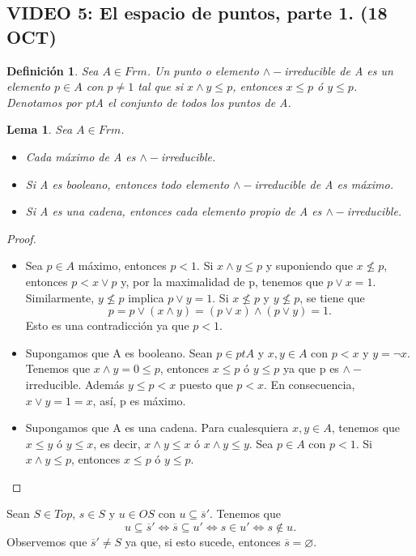 \documentclass[12pt,letterpaper,titlepage]{article}
\let\emptyset\varnothing
\newtheorem*{defn}{Definición}
\newtheorem*{lemma}{Lema}
\theoremstyle{definition}
\renewcommand\sup{\vee}
\renewcommand\inf{\wedge}
\newcommand\<{\langle}
\renewcommand\>{\rangle}
\begin{document}
\subsection{VIDEO 5: El espacio de puntos, parte 1. (18 OCT)}
\begin{defn}
  Sea $A\in Frm$. Un punto o elemento $\inf-$irreducible de A es un elemento $p\in A$ con $p\neq 1$ tal que si $x\inf y\leq p$, entonces $x\leq p$ ó $y\leq p$. Denotamos por ptA el conjunto de todos los puntos de A.
\end{defn}
\begin{lemma}
  Sea $A\in Frm$.
  \begin{itemize}
      \item Cada máximo de A es $\inf-$irreducible.
      \item Si A es booleano, entonces todo elemento $\inf-$irreducible de A es máximo.
      \item Si A es una cadena, entonces cada elemento propio de A es $\inf-$irreducible.
  \end{itemize}
\end{lemma}
\begin{proof}\quad
  \begin{itemize}
      \item Sea $p\in A$ máximo, entonces $p<1$. Si $x\inf y\leq p$ y suponiendo que $x\not\leq p$, entonces $p<x\sup p$ y, por la maximalidad de p, tenemos que $p\sup x=1$. Similarmente, $y\not\leq p$ implica $p\sup y=1$. Si $x\not\leq p$ y $y\not\leq p$, se tiene que 
      \[p=p\sup (x\inf y)=(p\sup x)\inf(p\sup y)=1.\]
      Esto es una contradicción ya que $p<1$.
      \item Supongamos que A es booleano. Sean $p\in ptA$ y $x,y\in A$ con $p<x$ y $y=\neg x$. Tenemos que $x\inf y=0\leq p$, entonces $x\leq p$ ó $y\leq p$ ya que p es $\inf-$irreducible. Además $y\leq p<x$ puesto que $p<x$. En consecuencia, $x\sup y=1=x$, así, p es máximo.
      \item Supongamos que A es una cadena. Para cualesquiera $x,y\in A$, tenemos que $x\leq y$ ó $y\leq x$, es decir, $x\inf y\leq x$ ó $x\inf y\leq y$. Sea $p\in A$ con $p<1$. Si $x\inf y\leq p$, entonces $x\leq p$ ó $y\leq p$.
  \end{itemize}
\end{proof}
Sean $S\in Top$, $s\in S$ y $u\in OS$ con $u\subseteq \overline{s}'$. Tenemos que
\[u\subseteq \overline{s}' \iff \overline{s}\subseteq u' \iff s\in u' \iff s\notin u.\]
Observemos que $\overline{s}'\neq S$ ya que, si esto sucede, entonces $\overline{s}=\emptyset$.\par 
\end{document}
